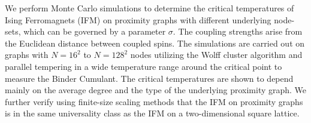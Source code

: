 We perform Monte Carlo simulations to determine the critical temperatures
of Ising Ferromagnets (IFM) on proximity graphs with different underlying
node-sets, which can be governed by a parameter $\sigma$.
The coupling strengths arise from the Euclidean distance
between coupled spins.
The simulations are carried out on graphs with \(N=16^{2}\) to \(N=128^{2}\)
nodes utilizing the Wolff cluster algorithm and parallel tempering in a
wide temperature range around the critical point to measure the Binder Cumulant.
The critical temperatures are shown to depend mainly on the average degree
and the type of the underlying proximity graph.
We further verify using finite-size scaling methods that the IFM on proximity
graphs is in the same universality class as the IFM on a two-dimensional
square lattice.

